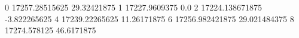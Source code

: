 0 17257.28515625 29.32421875
1 17227.9609375 0.0
2 17224.138671875 -3.822265625
4 17239.22265625 11.26171875
6 17256.982421875 29.021484375
8 17274.578125 46.6171875
